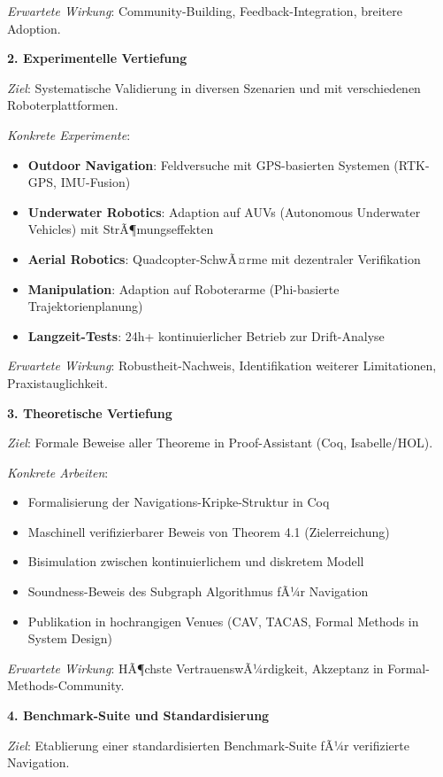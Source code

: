 ﻿\documentclass[a4paper,12pt]{article}
\theoremstyle{definition}
\begin{document}
\textit{Erwartete Wirkung}: Community-Building, Feedback-Integration, breitere Adoption.

\textbf{2. Experimentelle Vertiefung}

\textit{Ziel}: Systematische Validierung in diversen Szenarien und mit verschiedenen Roboterplattformen.

\textit{Konkrete Experimente}:
\begin{itemize}
	\item \textbf{Outdoor Navigation}: Feldversuche mit GPS-basierten Systemen (RTK-GPS, IMU-Fusion)
	\item \textbf{Underwater Robotics}: Adaption auf AUVs (Autonomous Underwater Vehicles) mit StrÃ¶mungseffekten
	\item \textbf{Aerial Robotics}: Quadcopter-SchwÃ¤rme mit dezentraler Verifikation
	\item \textbf{Manipulation}: Adaption auf Roboterarme (Phi-basierte Trajektorienplanung)
	\item \textbf{Langzeit-Tests}: 24h+ kontinuierlicher Betrieb zur Drift-Analyse
\end{itemize}

\textit{Erwartete Wirkung}: Robustheit-Nachweis, Identifikation weiterer Limitationen, Praxistauglichkeit.

\textbf{3. Theoretische Vertiefung}

\textit{Ziel}: Formale Beweise aller Theoreme in Proof-Assistant (Coq, Isabelle/HOL).

\textit{Konkrete Arbeiten}:
\begin{itemize}
	\item Formalisierung der Navigations-Kripke-Struktur in Coq
	\item Maschinell verifizierbarer Beweis von Theorem 4.1 (Zielerreichung)
	\item Bisimulation zwischen kontinuierlichem und diskretem Modell
	\item Soundness-Beweis des Subgraph Algorithmus fÃ¼r Navigation
	\item Publikation in hochrangigen Venues (CAV, TACAS, Formal Methods in System Design)
\end{itemize}

\textit{Erwartete Wirkung}: HÃ¶chste VertrauenswÃ¼rdigkeit, Akzeptanz in Formal-Methods-Community.

\textbf{4. Benchmark-Suite und Standardisierung}

\textit{Ziel}: Etablierung einer standardisierten Benchmark-Suite fÃ¼r verifizierte Navigation.
\end{document}
